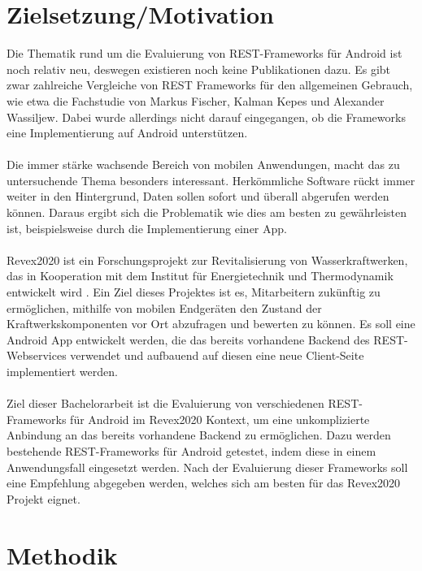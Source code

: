 \documentclass[a4paper,11pt,german,public]{INSOexpose}
\begin{document}
\section{Zielsetzung/Motivation}
Die Thematik rund um die Evaluierung von REST-Frameworks für Android ist noch relativ neu, deswegen existieren noch keine Publikationen dazu. Es gibt zwar zahlreiche Vergleiche von REST Frameworks für den allgemeinen Gebrauch, wie etwa die Fachstudie von Markus Fischer, Kalman Kepes und Alexander Wassiljew\cite{vergleich13}. Dabei wurde allerdings nicht darauf eingegangen, ob die Frameworks eine Implementierung auf Android unterstützen.
\\\\
Die immer stärke wachsende Bereich von mobilen Anwendungen, macht das zu untersuchende Thema besonders interessant. Herkömmliche Software rückt immer weiter in den Hintergrund, Daten sollen sofort und überall abgerufen werden können. Daraus ergibt sich die Problematik wie dies am besten zu gewährleisten ist, beispielsweise durch die Implementierung einer App. 
\\\\
Revex2020 ist ein Forschungsprojekt zur Revitalisierung von Wasserkraftwerken, das in Kooperation mit dem Institut für Energietechnik und Thermodynamik entwickelt wird \cite{projektbeschreibung:revex2020}. Ein Ziel dieses Projektes ist es, Mitarbeitern zukünftig zu ermöglichen, mithilfe von mobilen Endgeräten den Zustand der Kraftwerkskomponenten vor Ort abzufragen und bewerten zu können. Es soll eine Android App entwickelt werden, die das bereits vorhandene Backend des REST-Webservices verwendet und aufbauend auf diesen eine neue Client-Seite implementiert werden.
\\\\
Ziel dieser Bachelorarbeit ist die Evaluierung von verschiedenen REST-Frameworks für Android im Revex2020 Kontext, um eine unkomplizierte Anbindung an das bereits vorhandene Backend zu ermöglichen. Dazu werden bestehende REST-Frameworks für Android getestet, indem diese in einem Anwendungsfall eingesetzt werden. Nach der Evaluierung dieser Frameworks soll eine Empfehlung abgegeben werden, welches sich am besten für das Revex2020 Projekt eignet.
\newpage
\section{Methodik}
\end{document}
